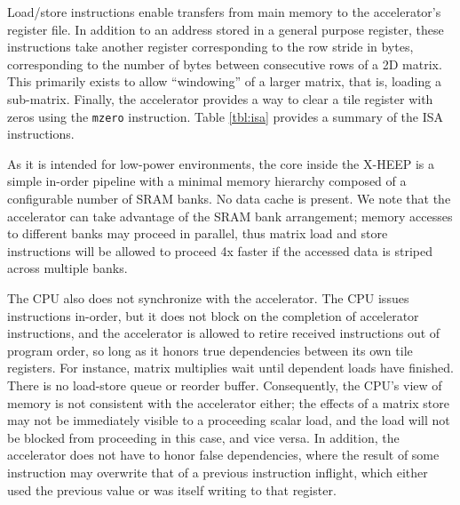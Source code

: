 \documentclass[acmsmall, nonacm=true]{acmart}
\begin{document}
Load/store instructions enable transfers from main memory to the accelerator's register file. In addition to an address stored in a general purpose register, these instructions take another register corresponding to the row stride in bytes, corresponding to the number of bytes between consecutive rows of a 2D matrix. This primarily exists to allow ``windowing'' of a larger matrix, that is, loading a sub-matrix. Finally, the accelerator provides a way to clear a tile register with zeros using the \verb|mzero| instruction. Table \ref{tbl:isa} provides a summary of the ISA instructions.

As it is intended for low-power environments, the core inside the X-HEEP is a simple in-order pipeline with a minimal memory hierarchy composed of a configurable number of SRAM banks. No data cache is present. We note that the accelerator can take advantage of the SRAM bank arrangement; memory accesses to different banks may proceed in parallel, thus matrix load and store instructions will be allowed to proceed 4x faster if the accessed data is striped across multiple banks.

The CPU also does not synchronize with the accelerator. The CPU issues instructions in-order, but it does not block on the completion of accelerator instructions, and the accelerator is allowed to retire received instructions out of program order, so long as it honors true dependencies between its own tile registers. For instance, matrix multiplies wait until dependent loads have finished. There is no load-store queue or reorder buffer. Consequently, the CPU's view of memory is not consistent with the accelerator either; the effects of a matrix store may not be immediately visible to a proceeding scalar load, and the load will not be blocked from proceeding in this case, and vice versa. 
In addition, the accelerator does not have to honor false dependencies, where the result of some instruction may overwrite that of a previous instruction inflight, which either used the previous value or was itself writing to that register.
\end{document}

